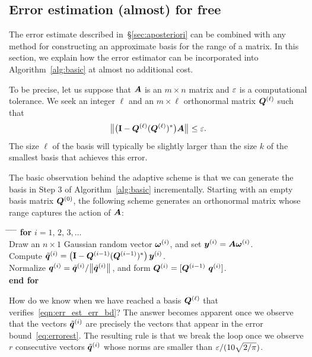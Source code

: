 \documentclass[final]{siamltex}
\newcounter{algorithm}[section]
\begin{document}
\subsection{Error estimation (almost) for free}
\label{sec:algorithm1}

The error estimate described in~\S\ref{sec:aposteriori} can be combined
with any method for constructing an approximate basis for the range of
a matrix.  In this section, we explain how the error estimator
can be incorporated into Algorithm~\ref{alg:basic} at almost no
additional cost.

To be precise, let us suppose that $\bm{A}$ is an $m \times n$ matrix
and $\varepsilon$ is a computational tolerance.  We seek an integer $\ell$ and
an $m \times \ell$ orthonormal matrix $\bm{Q}^{(\ell)}$ such that
\begin{equation} \label{eqn:err_est_err_bd}
\smnorm{}{ \big(\Id - \mtx{Q}^{(\ell)} (\mtx{Q}^{(\ell)})^{\adj} \big)\mtx{A} } \leq \eps.
\end{equation}
The size $\ell$ of the basis will typically be slightly larger than
the size $k$ of the smallest basis that achieves this error.

The basic observation behind the adaptive scheme is that we can
generate the basis in Step 3 of Algorithm~\ref{alg:basic} incrementally.
Starting with an empty basis matrix $\bm{Q}^{(0)}$, the following
scheme generates an orthonormal matrix whose range captures the action
of $\bm{A}$:
\lsp
\begin{tabbing}
\hspace{8mm} \= \hspace{8mm} \= \hspace{8mm} \= \hspace{8mm} \= \kill
\>\textbf{for} $i = 1,\,2,\,3,\dots$\\
\>\> Draw an $n\times 1$ Gaussian random vector $\bm{\omega}^{(i)}$, and set
      $\bm{y}^{(i)} = \bm{A}\bm{\omega}^{(i)}$.\\
\>\> Compute $\tilde{\bm{q}}^{(i)} = \left(\mathbf{I} - \bm{Q}^{(i-1)}(\bm{Q}^{(i-1)})^{*}\right)\bm{y}^{(i)}$.\\
\>\> Normalize $\bm{q}^{(i)} = \tilde{\bm{q}}^{(i)}/{\bigl\Vert {\tilde{\bm{q}}^{(i)}} \bigr\Vert}_{}$,
and form $\mtx{Q}^{(i)} = [\mtx{Q}^{(i-1)}\ \vct{q}^{(i)}]$.\\
\>\textbf{end for}
\end{tabbing}
\lsp
How do we know when we have reached a basis $\bm{Q}^{(\ell)}$
that verifies~\eqref{eqn:err_est_err_bd}?  The answer becomes
apparent once we observe that the vectors $\tilde{\bm{q}}^{(i)}$
are precisely the vectors that appear in the error bound~\eqref{eq:errorest}.
The resulting rule is that we break the loop once we observe $r$
consecutive vectors $\tilde{\bm{q}}^{(i)}$ whose norms are smaller
than $\varepsilon/(10\sqrt{2/\pi})$.
\end{document}
